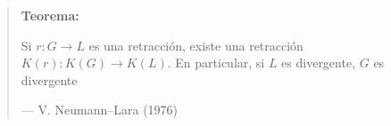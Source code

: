 \documentclass[beamer]{standalone}
\begin{document}
\begin{standaloneframe}
  \begin{quote}
    \textbf{Teorema:}

    Si $r\colon G\to L$ es una retracción, existe una retracción
    $K(r)\colon K(G)\to K(L)$. En particular, si $L$ es divergente,
    $G$ es divergente

    \hfill--- \color{purple} V. Neumann--Lara (1976)
  \end{quote}
\end{standaloneframe}
\end{document}

